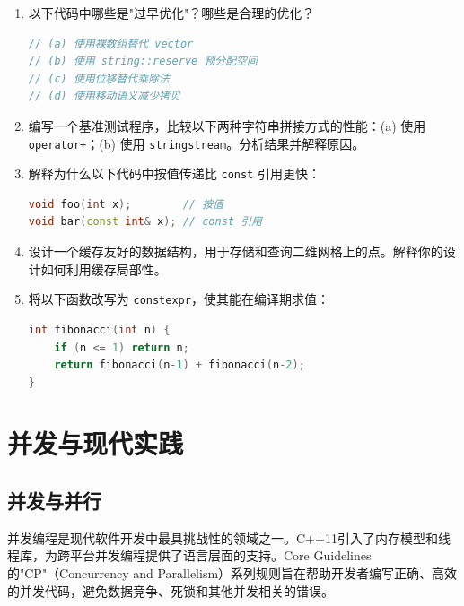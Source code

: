 \begin{enumerate}
\item 以下代码中哪些是"过早优化"？哪些是合理的优化？
\begin{lstlisting}[language=C++]
// (a) 使用裸数组替代 vector
// (b) 使用 string::reserve 预分配空间
// (c) 使用位移替代乘除法
// (d) 使用移动语义减少拷贝
\end{lstlisting}

\item 编写一个基准测试程序，比较以下两种字符串拼接方式的性能：(a) 使用 \texttt{operator+}；(b) 使用 \texttt{stringstream}。分析结果并解释原因。

\item 解释为什么以下代码中按值传递比 \texttt{const} 引用更快：
\begin{lstlisting}[language=C++]
void foo(int x);        // 按值
void bar(const int& x); // const 引用
\end{lstlisting}

\item 设计一个缓存友好的数据结构，用于存储和查询二维网格上的点。解释你的设计如何利用缓存局部性。

\item 将以下函数改写为 \texttt{constexpr}，使其能在编译期求值：
\begin{lstlisting}[language=C++]
int fibonacci(int n) {
    if (n <= 1) return n;
    return fibonacci(n-1) + fibonacci(n-2);
}
\end{lstlisting}
\end{enumerate}


\part{并发与现代实践}


\chapter{并发与并行}

并发编程是现代软件开发中最具挑战性的领域之一。C++11引入了内存模型和线程库，为跨平台并发编程提供了语言层面的支持。Core Guidelines 的"CP"（Concurrency and Parallelism）系列规则旨在帮助开发者编写正确、高效的并发代码，避免数据竞争、死锁和其他并发相关的错误。

